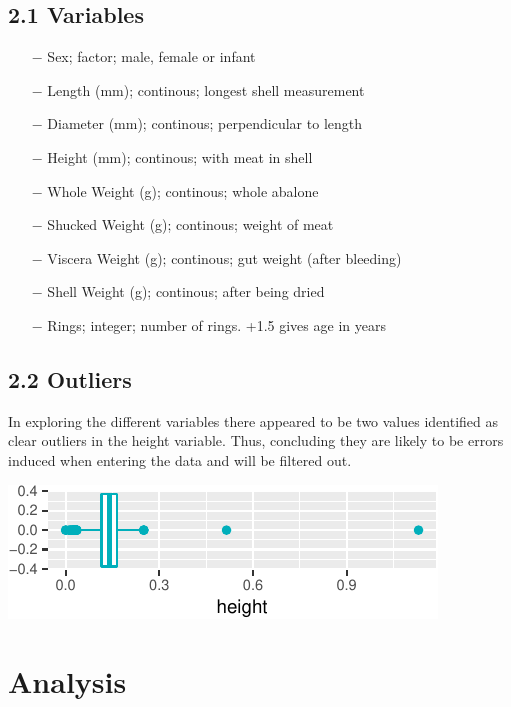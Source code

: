 \documentclass[letterpaper,9pt,twocolumn,twoside,]{pinp}
\begin{document}
\hypertarget{variables}{%
\subsection{2.1 Variables}\label{variables}}

\begin{itemize}
     \item[$-$] Sex; factor; male, female or infant
     \item[$-$] Length (mm); continous; longest shell measurement
     \item[$-$] Diameter (mm); continous; perpendicular to length
     \item[$-$] Height (mm); continous; with meat in shell
     \item[$-$] Whole Weight (g); continous; whole abalone
     \item[$-$] Shucked Weight (g); continous; weight of meat
     \item[$-$] Viscera Weight (g); continous; gut weight (after bleeding)
     \item[$-$] Shell Weight (g); continous; after being dried
     \item[$-$] Rings; integer; number of rings. +1.5 gives age in years
\end{itemize}

\hypertarget{outliers}{%
\subsection{2.2 Outliers}\label{outliers}}

In exploring the different variables there appeared to be two values
identified as clear outliers in the height variable. Thus, concluding
they are likely to be errors induced when entering the data and will be
filtered out.

\begin{center}\includegraphics{ExecSum_files/figure-latex/unnamed-chunk-1-1} \end{center}

\hypertarget{analysis}{%
\section{Analysis}\label{analysis}}
\end{document}
